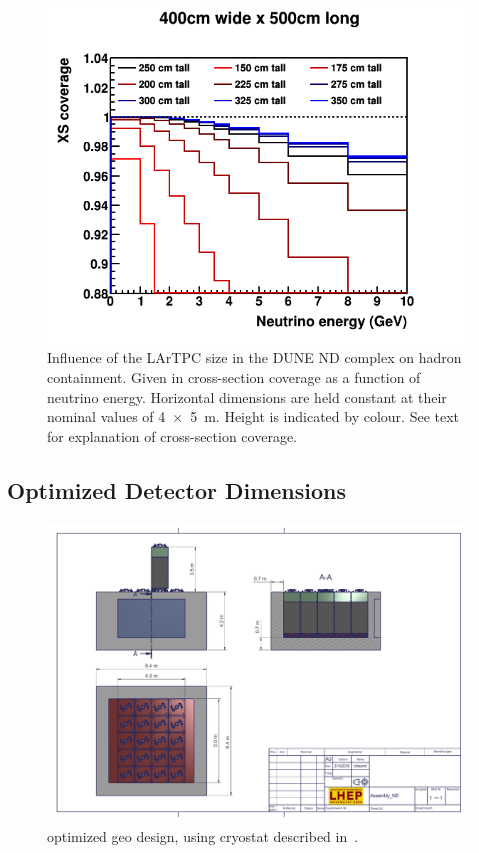 \documentclass[a4paper]{article}
\begin{document}
\begin{figure}[tbp]
	\centering
	\includegraphics[width=\textwidth]{Figures/lartpc_size_vertical}
	\caption{Influence of the LArTPC size in the DUNE ND complex on hadron containment.
		Given in cross-section coverage as a function of neutrino energy.
		Horizontal dimensions are held constant at their nominal values of \SI{4 x 5}{\metre}.
		Height is indicated by colour.
		See text for explanation of cross-section coverage.~\cite{lartpcSizeChris}
	}
	\label{fig:dune-nd_lartpc-size}
\end{figure}

\subsection{Optimized Detector Dimensions}

\begin{figure}[tbp]
	\centering
	\includegraphics[width=\textwidth]{Figures/Assembly_ND-1}
	\caption{optimized geo design, using cryostat described in~\cite{gas}.}
	\label{fig:dune-nd_lartpc-size}
\end{figure}
\end{document}
